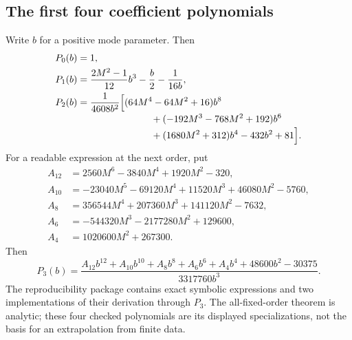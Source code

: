 \documentclass[11pt]{article}
\theoremstyle{definition}\newtheorem{definition}[theorem]{Definition}
\theoremstyle{remark}\newtheorem{remark}[theorem]{Remark}
\begin{document}
\subsection{The first four coefficient polynomials}\label{dep:hl:sec:polys}
Write $b$ for a positive mode parameter. Then
\begin{align}
 P_0(b)&=1,\label{dep:hl:eq:p0}\\
 P_1(b)&=\frac{2M^2-1}{12}b^3-\frac b2-\frac1{16b},\label{dep:hl:eq:p1}\\
 P_2(b)&=\frac{1}{4608b^2}\Bigl[
 (64M^4-64M^2+16)b^8\notag\\[-2pt]
 &\hspace{27mm}+(-192M^3-768M^2+192)b^6\notag\\[-2pt]
 &\hspace{27mm}+(1680M^2+312)b^4-432b^2+81\Bigr].\label{dep:hl:eq:p2}
\end{align}
For a readable expression at the next order, put
\begin{align*}
 A_{12}&=2560M^6-3840M^4+1920M^2-320,\\
 A_{10}&=-23040M^5-69120M^4+11520M^3+46080M^2-5760,\\
 A_8&=356544M^4+207360M^3+141120M^2-7632,\\
 A_6&=-544320M^3-2177280M^2+129600,\\
 A_4&=1020600M^2+267300.
\end{align*}
Then
\begin{equation}\label{dep:hl:eq:p3}
 P_3(b)=\frac{A_{12}b^{12}+A_{10}b^{10}+A_8b^8+A_6b^6
                      +A_4b^4+48600b^2-30375}{3317760b^3}.
\end{equation}
The reproducibility package contains exact symbolic expressions and two
implementations of their derivation through $P_3$. The all-fixed-order
theorem is analytic; these four checked polynomials are its displayed
specializations, not the basis for an extrapolation from finite data.
\end{document}
